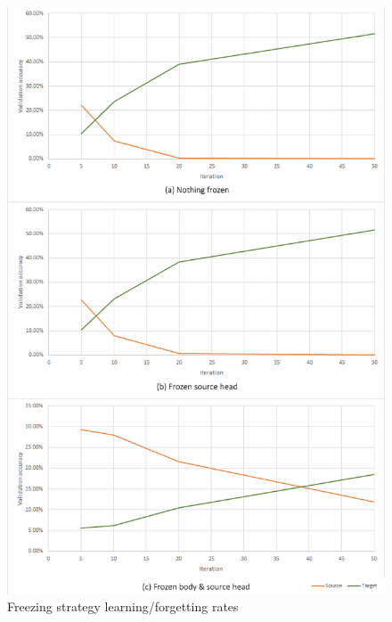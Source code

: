 \documentclass{report}
\begin{document}
	\begin{figure}[h]
		\centering
		\includegraphics[width=12cm]{book}
		\caption{Freezing strategy learning/forgetting rates}
		\label{fig:book:1}
	\end{figure}
\end{document}

